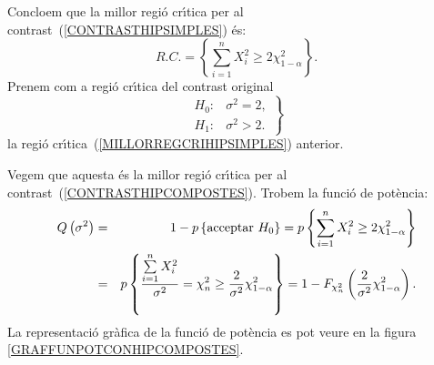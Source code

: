 {Concloem que la millor regi\'o cr\'{\i}tica per al 
contrast~(\ref{CONTRASTHIPSIMPLES}) \'es:
\begin{equation}
R.C.=\left\{\sum_{i=1}^n X_i^2\geq 2\chi_{1-\alpha}^2\right\}.
\label{MILLORREGCRIHIPSIMPLES}
\end{equation}
Prenem com a regi\'o cr\'{\i}tica del contrast original
\begin{equation}
\left.
\begin{array}{ll}
H_0 :& \sigma^2 =2, \\
H_1 :&  \sigma^2 >2.
\end{array}
\right\}
\label{CONTRASTHIPCOMPOSTES}
\end{equation}
la regi\'o cr\'{\i}tica~(\ref{MILLORREGCRIHIPSIMPLES}) anterior.

Vegem que aquesta \'es la millor regi\'o cr\'{\i}tica per al
contrast~(\ref{CONTRASTHIPCOMPOSTES}).
\newpage
Trobem la funci\'o de pot\`encia:
\begin{eqnarray*}
Q\left(\sigma^2\right)& = & 1-p\left\{\mbox{acceptar $H_0$}\right\}
=p\left\{\sum_{i=1}^n X_i^2\geq 2\chi_{1-\alpha}^2\right\}\\ 
& = & p\left\{\frac{\sum\limits_{i=1}^n X_i^2}{\sigma^2}=\chi_n^2
\geq \frac{2}{\sigma^2}\chi_{1-\alpha}^2\right\}=
1-F_{\chi_n^2}\left(\frac{2}{\sigma^2}\chi_{1-\alpha}^2\right).
\end{eqnarray*}
La representaci\'o gr\`afica de la funci\'o de pot\`encia es pot 
veure en la figura \ref{GRAFFUNPOTCONHIPCOMPOSTES}.

}
